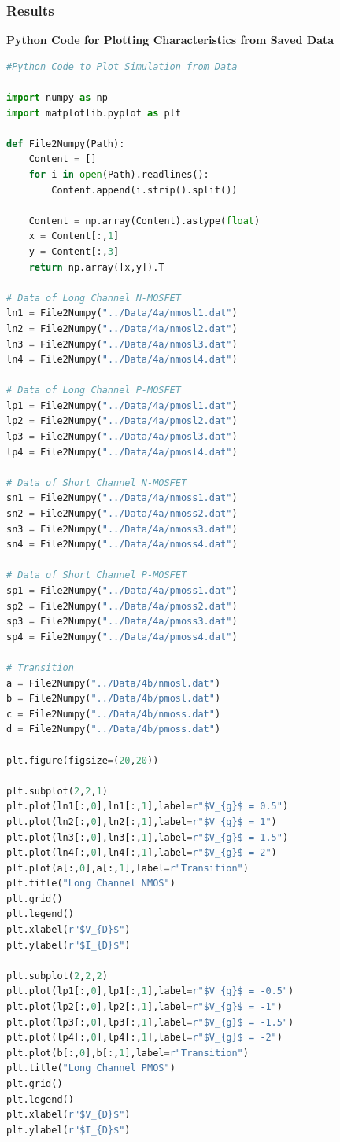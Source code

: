 \documentclass{article}
\begin{document}
\subsubsection{Results}
\textbf{Python Code for Plotting Characteristics from Saved Data}
\begin{lstlisting}[language=Python]
#Python Code to Plot Simulation from Data

import numpy as np
import matplotlib.pyplot as plt

def File2Numpy(Path):
	Content = []
	for i in open(Path).readlines():
		Content.append(i.strip().split())
		
	Content = np.array(Content).astype(float)
	x = Content[:,1]
	y = Content[:,3]
	return np.array([x,y]).T
	
# Data of Long Channel N-MOSFET
ln1 = File2Numpy("../Data/4a/nmosl1.dat")
ln2 = File2Numpy("../Data/4a/nmosl2.dat")
ln3 = File2Numpy("../Data/4a/nmosl3.dat")
ln4 = File2Numpy("../Data/4a/nmosl4.dat")

# Data of Long Channel P-MOSFET
lp1 = File2Numpy("../Data/4a/pmosl1.dat")
lp2 = File2Numpy("../Data/4a/pmosl2.dat")
lp3 = File2Numpy("../Data/4a/pmosl3.dat")
lp4 = File2Numpy("../Data/4a/pmosl4.dat")

# Data of Short Channel N-MOSFET
sn1 = File2Numpy("../Data/4a/nmoss1.dat")
sn2 = File2Numpy("../Data/4a/nmoss2.dat")
sn3 = File2Numpy("../Data/4a/nmoss3.dat")
sn4 = File2Numpy("../Data/4a/nmoss4.dat")

# Data of Short Channel P-MOSFET
sp1 = File2Numpy("../Data/4a/pmoss1.dat")
sp2 = File2Numpy("../Data/4a/pmoss2.dat")
sp3 = File2Numpy("../Data/4a/pmoss3.dat")
sp4 = File2Numpy("../Data/4a/pmoss4.dat")

# Transition
a = File2Numpy("../Data/4b/nmosl.dat")
b = File2Numpy("../Data/4b/pmosl.dat")
c = File2Numpy("../Data/4b/nmoss.dat")
d = File2Numpy("../Data/4b/pmoss.dat")

plt.figure(figsize=(20,20))

plt.subplot(2,2,1)
plt.plot(ln1[:,0],ln1[:,1],label=r"$V_{g}$ = 0.5")
plt.plot(ln2[:,0],ln2[:,1],label=r"$V_{g}$ = 1")
plt.plot(ln3[:,0],ln3[:,1],label=r"$V_{g}$ = 1.5")
plt.plot(ln4[:,0],ln4[:,1],label=r"$V_{g}$ = 2")
plt.plot(a[:,0],a[:,1],label=r"Transition")
plt.title("Long Channel NMOS")
plt.grid()
plt.legend()
plt.xlabel(r"$V_{D}$")
plt.ylabel(r"$I_{D}$")

plt.subplot(2,2,2)
plt.plot(lp1[:,0],lp1[:,1],label=r"$V_{g}$ = -0.5")
plt.plot(lp2[:,0],lp2[:,1],label=r"$V_{g}$ = -1")
plt.plot(lp3[:,0],lp3[:,1],label=r"$V_{g}$ = -1.5")
plt.plot(lp4[:,0],lp4[:,1],label=r"$V_{g}$ = -2")
plt.plot(b[:,0],b[:,1],label=r"Transition")
plt.title("Long Channel PMOS")
plt.grid()
plt.legend()
plt.xlabel(r"$V_{D}$")
plt.ylabel(r"$I_{D}$")


\end{lstlisting}
\end{document}
